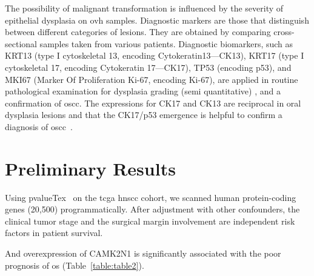 \documentclass[12pt, a4paper]{article}
\newcommand{\comm}[1]{} %
\begin{document}
The possibility of malignant transformation is influenced by the severity of epithelial dysplasia on \acrshort{ovh} samples.
Diagnostic markers are those that distinguish between different categories of lesions. They are obtained by comparing cross-sectional samples taken from various patients.
Diagnostic biomarkers, such as KRT13 (type I cytoskeletal 13, encoding Cytokeratin13---CK13), KRT17 (type I cytoskeletal 17, encoding Cytokeratin 17---CK17), TP53 (encoding p53), and MKI67 (Marker Of Proliferation Ki-67, encoding Ki-67), are applied in routine pathological examination for dysplasia grading (semi quantitative) , and a confirmation of \acrshort{oscc}.
The expressions for CK17 and CK13 are reciprocal in oral dysplasia lesions and that the CK17/p53 emergence is helpful to confirm a diagnosis of \acrshort{oscc}~\citep{Mikami2011}.

 



\section{Preliminary Results}
Using pvalueTex~\citep{Chi2021} on the \acrshort{tcga} \acrshort{hnscc} cohort, we scanned human protein-coding genes (20,500) programmatically. After adjustment with other confounders, the clinical tumor stage and the surgical margin involvement are independent risk factors in patient survival. 

And overexpression of CAMK2N1 is significantly associated with the poor prognosis of \acrfull{os} (Table~\ref{table:table2}). 


\comm{
In our previous transtriptomics study~\citep{Chi2020}, %
the 9416 Kaplan-Meier plots with associated Cox's univariate and multivariate tables were generated by Cox modeling %
and justified by the ranking of hazard ratios.
The 967 genes were kept by criteria of uncorrected \textit{P} value (below 0.05) and \acrfull{hr} (greater than 1.5 or less than 0.5). %
At the final step, a stringent criteria (Bonferroni \textit{P} value correction) was used to yield a candidates: CAMK2N1. %
} %
\end{document}
